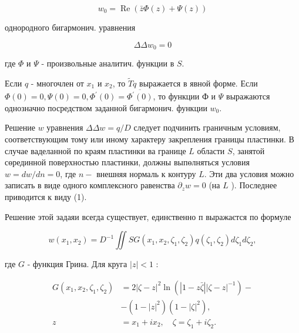 \documentclass[10pt]{article}
\begin{document}
\[

w_{0}=\operatorname{Re}(\bar{z} \Phi(z)+\Psi(z))

\]



однородного бигармонич. уравнения



\[

\Delta \Delta w_{0}=0

\]



где $\Phi$ и $\Psi$ - произвольные аналитич. функции в $S$.



Если $q$ - многочлен от $x_{1}$ и $x_{2}$, то $\tilde{T} q$ выражается в явной форме. Если $\Phi(0)=0, \Psi(0)=0, \Phi^{\prime}(0)=\overline{\Phi^{\prime}(0)}$, то функции $Ф$ и $\Psi$ выражаются однозначно посредством заданной бигармонич. функции $w_{0}$.



Решение $w$ уравнения $\Delta \Delta w=q / D$ следует подчинить граничным условиям, соответствующим тому или иному характеру закрепления границы пластинки. В случае ваделанной по краям пластинки ва границе $L$ области $S$, занятой сөрединной поверхностью пластинки, должны выпөлняться условия $w=d w / d n=0$, где $n-$ внешняя нормаль к контуру $L$. Эти два условия можно записать в виде одного комплексного равенства $\partial_{z} w=0$ (на $L$ ). Последнее приводится к виду (1).



Решение этой задаяи всегда существует, единственно п выражаєтся по формуле



\[

w\left(x_{1}, x_{2}\right)=D^{-1} \iint S G\left(x_{1}, x_{2}, \zeta_{1}, \zeta_{2}\right) q\left(\zeta_{1}, \zeta_{2}\right) d \zeta_{1} d \zeta_{2},

\]



где $G$ - функция Грина. Для круга $|z|<1$ :



\[

\begin{aligned}

G\left(x_{1}, x_{2}, \zeta_{1}, \zeta_{2}\right) & =2|\zeta-z|^{2} \ln \left(|1-z \bar{\zeta}||\zeta-z|^{-1}\right)- \\

& -\left(1-|z|^{2}\right)\left(1-|\zeta|^{2}\right), \\

z & =x_{1}+i x_{2}, \quad \zeta=\zeta_{1}+i \zeta_{2} .

\end{aligned}

\]
\end{document}

